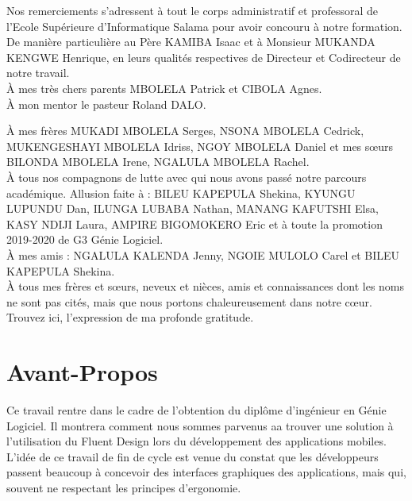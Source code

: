 \documentclass[a4paper,12pt]{report}
\begin{document}
    Nos remerciements s’adressent à tout le corps administratif et professoral de l’Ecole
    Supérieure d’Informatique Salama pour avoir concouru à notre formation.
    \\

    De manière particulière au Père KAMIBA Isaac et à Monsieur MUKANDA KENGWE Henrique,
    en leurs qualités respectives de Directeur et Co\-directeur de notre travail.
    \\

    À mes très chers parents MBOLELA Patrick et CIBOLA Agnes.
    \\

    À mon mentor le pasteur Roland DALO.
    

    À mes frères MUKADI MBOLELA Serges, NSONA MBOLELA Cedrick, MUKENGESHAYI MBOLELA Idriss,
    NGOY MBOLELA Daniel et mes sœurs BILONDA MBOLELA Irene, NGALULA MBOLELA Rachel.
    \\

    À tous nos compagnons de lutte avec qui nous avons passé notre parcours
    académique. Allusion faite à : BILEU KAPEPULA Shekina, KYUNGU LUPUNDU Dan, ILUNGA LUBABA Nathan, MANANG KAFUTSHI Elsa, KASY NDIJI Laura, 
    AMPIRE BIGOMOKERO Eric et à toute la promotion 2019-2020 de G3 Génie Logiciel.
    \\

    À mes amis : NGALULA KALENDA Jenny, NGOIE MULOLO Carel et BILEU KAPEPULA Shekina.
    \\

    À tous mes frères et sœurs, neveux et nièces, amis et connaissances dont les noms
    ne sont pas cités, mais que nous portons chaleureusement dans notre cœur.
    Trouvez ici, l’expression de ma profonde gratitude.

    \newpage

    \listoffigures
    \newpage

    \listoftables
    \newpage

    \tableofcontents
    \newpage

    \chapter*{Avant-Propos}
    Ce travail rentre dans le cadre de l’obtention du diplôme d'ingénieur en Génie Logiciel. 
    Il montrera comment nous sommes parvenus aa trouver une solution à l'utilisation du Fluent Design lors du développement des applications mobiles. L’idée de ce travail de fin de cycle est venue du constat que les développeurs passent beaucoup à concevoir des interfaces graphiques des applications, mais qui, souvent ne respectant les principes d'ergonomie.
    
\end{document}
